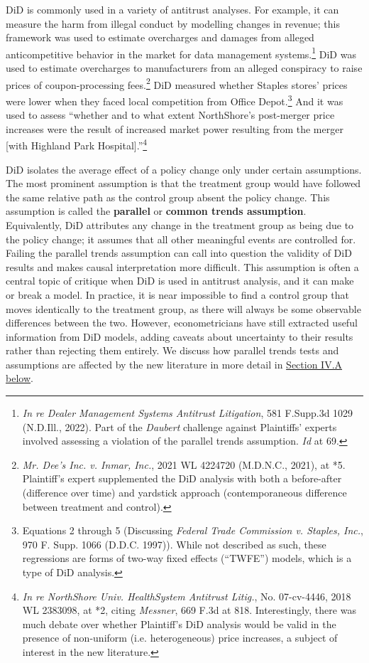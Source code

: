 \documentclass[12pt]{article}
\begin{document}
DiD is commonly used in a variety of antitrust analyses. For example, it can measure the harm from illegal conduct by modelling changes in revenue; this framework was used to estimate overcharges and damages from alleged anticompetitive behavior in the market for data management systems.\footnote{\textit{In re Dealer Management Systems Antitrust Litigation}, 581 F.Supp.3d 1029 (N.D.Ill., 2022). Part of the \textit{Daubert} challenge against Plaintiffs’ experts involved assessing a violation of the parallel trends assumption. \textit{Id} at 69.}  DiD was used to estimate overcharges to manufacturers from an alleged conspiracy to raise prices of coupon-processing fees.\footnote{\textit{Mr. Dee's Inc. v. Inmar, Inc.}, 2021 WL 4224720 (M.D.N.C., 2021), at *5. Plaintiff’s expert supplemented the DiD analysis with both a before-after (difference over time) and yardstick approach (contemporaneous difference between treatment and control). }  DiD measured whether Staples stores’ prices were lower when they faced local competition from Office Depot.\footnote{\citet{ashenfelter2004} Equations 2 through 5 (Discussing  \textit{Federal Trade Commission v. Staples, Inc.}, 970 F. Supp. 1066 (D.D.C. 1997)). While not described as such, these regressions are forms of two-way fixed effects (“TWFE”) models, which is a type of DiD analysis.}  And it was used to assess “whether and to what extent NorthShore's post-merger price increases were the result of increased market power resulting from the merger [with Highland Park Hospital].”\footnote{\textit{In re NorthShore Univ. HealthSystem Antitrust Litig.}, No. 07-cv-4446, 2018 WL 2383098, at *2, citing \textit{Messner}, 669 F.3d at 818. Interestingly, there was much debate over whether Plaintiff’s DiD analysis would be valid in the presence of non-uniform (i.e. heterogeneous) price increases, a subject of interest in the new literature.} 

DiD isolates the average effect of a policy change only under certain assumptions. The most prominent assumption is that the treatment group would have followed the same relative path as the control group absent the policy change. This assumption is called the \textbf{parallel} or \textbf{common trends assumption}. Equivalently, DiD attributes any change in the treatment group as being due to the policy change; it assumes that all other meaningful events are controlled for. Failing the parallel trends assumption can call into question the validity of DiD results and makes causal interpretation more difficult. This assumption is often a central topic of critique when DiD is used in antitrust analysis, and it can make or break a model. In practice, it is near impossible to find a control group that moves identically to the treatment group, as there will always be some observable differences between the two. However, econometricians have still extracted useful information from DiD models, adding caveats about uncertainty to their results rather than rejecting them entirely. We discuss how parallel trends tests and assumptions are affected by the new literature in more detail in \hyperref[sec:parallel-trends]{Section IV.A below}.
\end{document}
